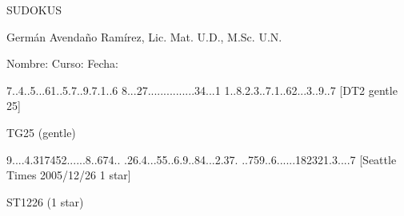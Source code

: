 \documentclass{article}
\begin{document}
\begin{center}
\large SUDOKUS
\end{center}
\begin{center}
Germ\'an Avenda\~no Ram\'irez, Lic. Mat. U.D., M.Sc. U.N.
\end{center}
Nombre: \hrulefill Curso: \underline{\hspace*{44pt}} Fecha: \underline{\hspace*{2.5cm}}
\cluefont{\Large}

\begin{center}
\renewcommand*{\puzzlefile}{tg25.sud}
\writepuzzle%
{7..4..5..}{.61..5.7.}{.9.7.1..6}%
{8...27...}{.........}{...34...1}%
{1..8.2.3.}{.7.1..62.}{..3..9..7}%
[DT2 gentle 25]
\vfill
\begin{minipage}{0.6\linewidth}\begin{center}
TG25 (gentle) \\
\end{center}\end{minipage}
\end{center}

\begin{center}
\renewcommand*{\puzzlefile}{st1226.sud}
\writepuzzle%
{9....4.31}{7452.....}{.8..674..}%
{.26.4...5}{5..6.9..8}{4...2.37.}%
{..759..6.}{.....1823}{21.3....7}%
[Seattle Times 2005/12/26 1 star]
\vfill
\begin{minipage}{0.6\linewidth}\begin{center}
ST1226 (1 star) \\
\end{center}\end{minipage}
\end{center}
\end{document}
